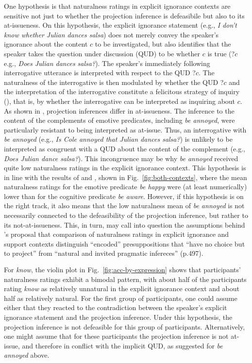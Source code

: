 \documentclass[11pt,fleqn]{article}
\newcommand{\6}{\mbox{$[\hspace*{-.6mm}[$}}
\newcommand{\9}{\mbox{$]\hspace*{-.6mm}]$}}
\newcommand{\citepos}[1]{\citeauthor{#1}'s \citeyear{#1}}
\begin{document}
One hypothesis is that naturalness ratings in explicit ignorance contexts are sensitive not just to whether the projection inference is defeasibile but also to its at-issueness. On this hypothesis, the explicit ignorance statement (e.g., {\em I don't know whether Julian dances salsa}) does not merely convey the speaker's ignorance about the content $c$ to be investigated, but also identifies that the speaker takes the question under discussion (QUD) to be whether $c$ is true (?$c$ e.g., {\em Does Julian dances salsa?}). The speaker's immediately following interrogative utterance is interpreted with respect to the QUD ?$c$. The naturalness of the interrogative is then modulated by whether the QUD ?$c$  and the interpretation of the interrogative constitute a felicitous strategy of inquiry (\citealt[32f.]{roberts12}), that is,  by whether the interrogative can be interpreted as inquiring about $c$. As shown in \citealt{tbd-variability}, projection inferences differ in at-issueness. The inference to the content of the complements of emotive predicates, including {\em be annoyed}, were particularly resistant to being interpreted as at-issue. Thus, an interrogative with {\em be annoyed} (e.g., {\em Is Cole annoyed that Julian dances salsa?}) is unlikely to be interpreted as congruent with a QUD about the content of the complement (e.g., {\em Does Julian dance salsa?}). This incongruence may be why {\em be annoyed} received quite low naturalness ratings in the explicit ignorance context. This hypothesis is in line with the results of \citealt[Exp.~3]{mandelkern-etal2020} and \citealt[Exp.~1]{kalomoiros-schwarz2024}, shown in Fig.~\ref{fig:both-contexts}, where the mean naturalness ratings for the emotive predicate \emph{be happy} were (at least numerically) lower than for the cognitive predicate \emph{be aware}. However, if this hypothesis is on the right track, it also means that the low naturalness mean of \emph{be annoyed} is not necessarily connected to the defeasibility of the projection inference, but rather to its not-at-issueness. This, in turn, may call into question the assumptions behind \citepos{mandelkern-etal2020} proposal that comparison of naturalness ratings in explicit ignorance and support contexts distinguish ``encoded'' presuppositions that ``have no choice but to project'' from ``natural and invited pragmatic infereces'' (p.497).

For \emph{know}, the violin plot in Fig.~\ref{fig:acc-by-expression} shows that participants' naturalness ratings exhibit a bimodal pattern, with about half of the participants rating \emph{know} as relatively unnatural in the explicit ignorance context and about half as relatively natural. For the first group of participants, one could assume either that they reacted to the contradiction between the speaker's explicit ignorance statement and the projection inference. Under this hypothesis, the projection inference is not defeasible for this group of participants. Alternatively, one might assume that for these participants the projection inference is not at-issue, and therefore in conflict with the implicit QUD, as suggested for \emph{be annoyed} above. 
\end{document}
